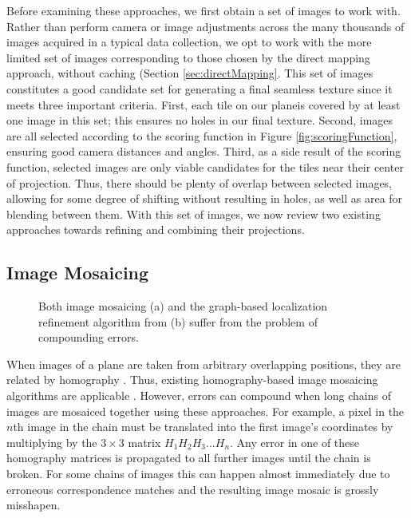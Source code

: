 \documentclass[10pt,twocolumn,letterpaper]{article}
\begin{document}
Before examining these approaches, we first obtain a set of images to
work with.  Rather than perform camera or image adjustments across the
many thousands of images acquired in a typical data collection, we opt
to work with the more limited set of images corresponding to those
chosen by the direct mapping approach, without caching (Section
\ref{sec:directMapping}. This set of images constitutes a good
candidate set for generating a final seamless texture since it meets
three important criteria. First, each tile on our planeis covered by
at least one image in this set; this ensures no holes in our final
texture. Second, images are all selected according to the scoring
function in Figure \ref{fig:scoringFunction}, ensuring good camera
distances and angles. Third, as a side result of the scoring function,
selected images are only viable candidates for the tiles near their
center of projection. Thus, there should be plenty of overlap between
selected images, allowing for some degree of shifting without
resulting in holes, as well as area for blending between them. With
this set of images, we now review two existing approaches towards
refining and combining their projections.

\subsection{Image Mosaicing}
\label{sec:imageMosaicing}

\begin{figure}
  \centering

  \centering
  \caption{Both image mosaicing (a) and the graph-based localization refinement algorithm from
    \cite{chen2010indoor} (b) suffer from the problem of compounding
    errors.}
  \label{fig:mosaic3D}
\end{figure}


When images of a plane are taken from arbitrary overlapping positions,
they are related by homography \cite{hz}. Thus, existing
homography-based image mosaicing algorithms are applicable
\cite{brown2007automatic}. However, errors can compound when long
chains of images are mosaiced together using these approaches. For
example, a pixel in the $n$th image in the chain must be translated
into the first image's coordinates by multiplying by the $3\times3$
matrix $H_1 H_2 H_3 ... H_n$. Any error in one of these homography
matrices is propagated to all further images until the chain is
broken. For some chains of images this can happen almost immediately
due to erroneous correspondence matches and the resulting image mosaic
is grossly misshapen.
\end{document}
